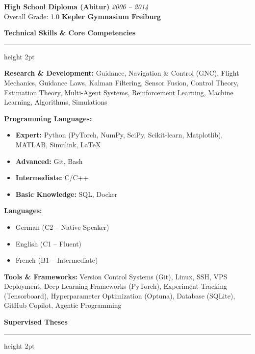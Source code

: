 \documentclass[11pt,a4paper]{article}
\newcommand{\sectiontitle}[1]{%
    \vspace{10pt}
    {\Large\bfseries\color{darkblue}#1}
    \nopagebreak
    \vspace{6pt}
    {\color{accentgreen}\hrule height 2pt}
    \vspace{8pt}
}
\newcommand{\degreeline}[4]{%
    \textbf{#1} \hfill \textit{\small #2}\\
    {\small #3} \hfill {\color{darkblue}\textbf{#4}}\\[3pt]
}
\begin{document}
\vspace{5pt}

\degreeline{High School Diploma (Abitur)}{2006 -- 2014}{Overall Grade: 1.0}{Kepler Gymnasium Freiburg}

\vspace{15pt}


\sectiontitle{Technical Skills \& Core Competencies}


\textbf{Research \& Development:}  
Guidance, Navigation \& Control (GNC), Flight Mechanics, Guidance Laws, Kalman Filtering, Sensor Fusion, Control Theory, Estimation Theory, Multi-Agent Systems, Reinforcement Learning, Machine Learning, Algorithms, Simulations

\vspace{0.5em}



\vspace{6pt}

\textbf{Programming Languages:}
\begin{itemize}
    \item \textbf{Expert:} Python (PyTorch, NumPy, SciPy, Scikit-learn, Matplotlib), MATLAB, Simulink, \LaTeX
    \item \textbf{Advanced:} Git, Bash
    \item \textbf{Intermediate:} C/C++
    \item \textbf{Basic Knowledge:} SQL, Docker
    
\end{itemize}

\vspace{6pt}

\textbf{Languages:}
\begin{itemize}
    \item German (C2 -- Native Speaker)
    \item English (C1 -- Fluent)
    \item French (B1 -- Intermediate)
\end{itemize}

\vspace{6pt}

\textbf{Tools \& Frameworks:}  
Version Control Systems (Git), Linux, SSH, VPS Deployment, Deep Learning Frameworks (PyTorch), Experiment Tracking (Tensorboard), Hyperparameter Optimization (Optuna),  Database (SQLite), GitHub Copilot, Agentic Programming


\vspace{15pt}

\sectiontitle{Supervised Theses}
\end{document}
